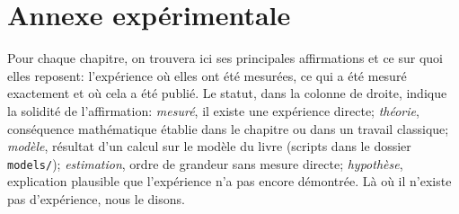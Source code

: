 \chapter{Annexe expérimentale}
\label{sec:supplement}

Pour chaque chapitre, on trouvera ici ses principales affirmations et ce sur quoi elles reposent: l'expérience où elles ont été mesurées, ce qui a été mesuré exactement et où cela a été publié. Le statut, dans la colonne de droite, indique la solidité de l'affirmation: \emph{mesuré}, il existe une expérience directe; \emph{théorie}, conséquence mathématique établie dans le chapitre ou dans un travail classique; \emph{modèle}, résultat d'un calcul sur le modèle du livre (scripts dans le dossier \texttt{models/}); \emph{estimation}, ordre de grandeur sans mesure directe; \emph{hypothèse}, explication plausible que l'expérience n'a pas encore démontrée. Là où il n'existe pas d'expérience, nous le disons.























